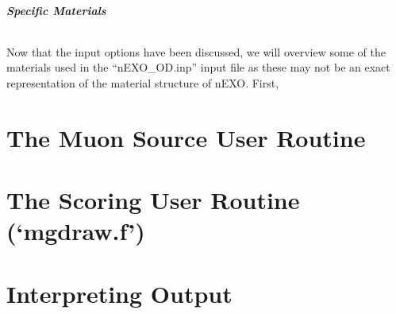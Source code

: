 \documentclass[10pt]{article}
\begin{document}
\subsubsection{Specific Materials}
\paragraph{}
Now that the input options have been discussed, we will overview some of the materials used in the ``nEXO\_OD.inp'' input file as these may not be an exact representation of the material structure of nEXO. First, 





\part*{The Muon Source User Routine}

\part*{The Scoring User Routine (`mgdraw.f')}


\part*{Interpreting Output}
\end{document}

